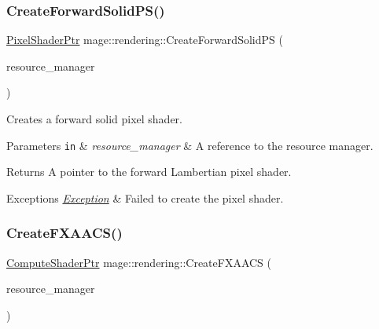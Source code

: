 \subsubsection{\texorpdfstring{Create\+Forward\+Solid\+P\+S()}{CreateForwardSolidPS()}}
{\footnotesize\ttfamily \mbox{\hyperlink{namespacemage_1_1rendering_af03d922b228ee9c8542baaa2ecc9f259}{Pixel\+Shader\+Ptr}} mage\+::rendering\+::\+Create\+Forward\+Solid\+PS (\begin{DoxyParamCaption}\item[{\mbox{\hyperlink{classmage_1_1rendering_1_1_resource_manager}{Resource\+Manager}} \&}]{resource\+\_\+manager }\end{DoxyParamCaption})}

Creates a forward solid pixel shader.


\begin{DoxyParams}[1]{Parameters}
\mbox{\tt in}  & {\em resource\+\_\+manager} & A reference to the resource manager. \\
\hline
\end{DoxyParams}
\begin{DoxyReturn}{Returns}
A pointer to the forward Lambertian pixel shader. 
\end{DoxyReturn}

\begin{DoxyExceptions}{Exceptions}
{\em \mbox{\hyperlink{classmage_1_1_exception}{Exception}}} & Failed to create the pixel shader. \\
\hline
\end{DoxyExceptions}
\mbox{\label{namespacemage_1_1rendering_a3913975f7b65d4e304a173edaab57732}} 
\subsubsection{\texorpdfstring{Create\+F\+X\+A\+A\+C\+S()}{CreateFXAACS()}}
{\footnotesize\ttfamily \mbox{\hyperlink{namespacemage_1_1rendering_ab3dc9f2114f2e9255b91d9c051da52ea}{Compute\+Shader\+Ptr}} mage\+::rendering\+::\+Create\+F\+X\+A\+A\+CS (\begin{DoxyParamCaption}\item[{\mbox{\hyperlink{classmage_1_1rendering_1_1_resource_manager}{Resource\+Manager}} \&}]{resource\+\_\+manager }\end{DoxyParamCaption})}

